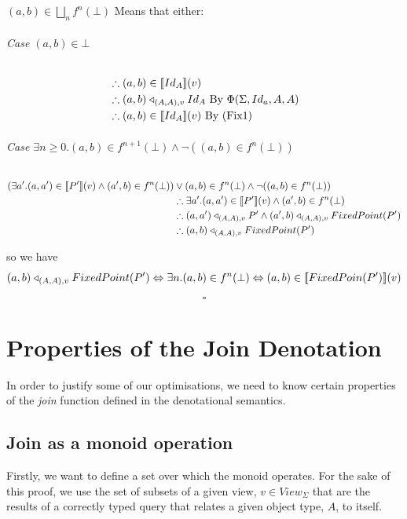 \documentclass[12pt,a4paper,twoside,openright]{report}
\newcommand\mathName[1]{\textit{#1}}
\newcommand{\db}[1]{{\bf [\![}#1{\bf ]\!]}}
\newcommand{\deno}[1]{\db{#1}(v)}
\newcommand{\denoRule}[2]{#1 \in \deno{#2}}
\newcommand{\opRule}[3]{#1 \triangleleft_{#2, v} #3}
\newcommand{\phiRule}[3]{\Phi(\Sigma, #1, #2, #3)}
\let\oldsubparagraph\subparagraph
\renewcommand{\subparagraph}[1]{\oldsubparagraph{#1}\mbox{}}
\begin{document}
$(a, b) \in \bigsqcup_n f^n(\bot)$ Means that either:

\subparagraph{Case $(a, b) \in \bot$}
\begin{equation}
\label{Case Bottom}
\begin{split}
& \therefore \denoRule{(a,b)}{Id_A}\\
& \therefore \opRule{(a,b)}{(A, A)}{Id_A} \mbox{ By $\phiRule{Id_a}{A}{A}$}\\
& \therefore \denoRule{(a,b)}{Id_A} \mbox{ By (Fix1)}
\end{split}
\end{equation}

\subparagraph{Case $\exists n \geq 0. (a, b) \in f^{n+1}(\bot) \wedge \neg ((a, b) \in f^n(\bot))$}
\begin{equation}
\label{Case n+1}
\begin{split}
(\exists a'. \denoRule{(a, a')}{P'} \wedge (a', b) \in f^{n}(\bot)) & \vee (a, b) \in f^{n}(\bot) \wedge \neg ((a, b) \in f^n(\bot))\\
&\therefore \exists a'. \denoRule{(a, a')}{P'} \wedge (a', b) \in f^{n}(\bot)\\
&\therefore \opRule{(a, a')}{(A, A)}{P'} \wedge \opRule{(a', b)}{(A, A)}{FixedPoint(P')}\\
&\therefore \opRule{(a,b)}{(A,A)}{FixedPoint(P')}
\end{split}
\end{equation}

so we have \[\opRule{(a, b)}{(A, A)}{FixedPoint(P')} \Leftrightarrow \exists n. (a, b) \in f^n(\bot) \Leftrightarrow \denoRule{(a, b)}{FixedPoin(P')}\]

$$\square$$

\chapter{Properties of the Join Denotation}
\label{MonoidJoins}

In order to justify some of our optimisations, we need to know certain properties of the \mathName{join} function defined in the denotational semantics. 

\section{Join as a monoid operation}
Firstly, we want to define a set over which the monoid operates. For the sake of this proof, we use the set of subsets of a given view, $v \in View_{\Sigma}$ that are the results of a correctly typed query that relates a given object type, $A$, to itself.
\end{document}
